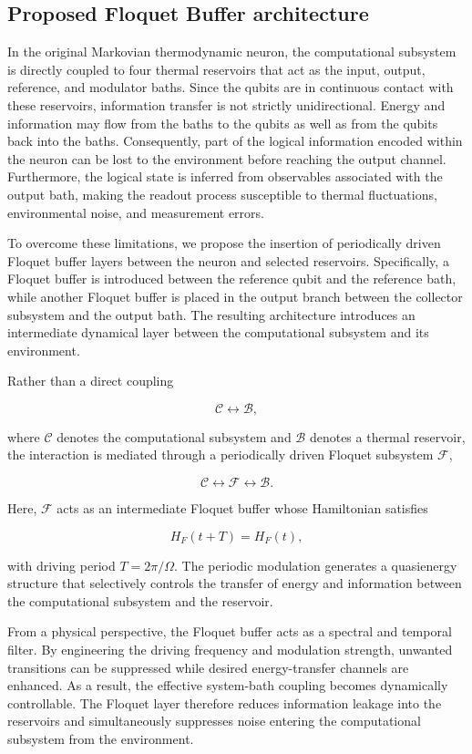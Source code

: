 \documentclass[11pt,a4paper]{article}
\theoremstyle{definition}
\theoremstyle{remark}
\begin{document}
\subsection{Proposed Floquet Buffer architecture}
In the original Markovian thermodynamic neuron, the computational subsystem is directly coupled to four thermal reservoirs that act as the input, output, reference, and modulator baths. Since the qubits are in continuous contact with these reservoirs, information transfer is not strictly unidirectional. Energy and information may flow from the baths to the qubits as well as from the qubits back into the baths. Consequently, part of the logical information encoded within the neuron can be lost to the environment before reaching the output channel. Furthermore, the logical state is inferred from observables associated with the output bath, making the readout process susceptible to thermal fluctuations, environmental noise, and measurement errors.

To overcome these limitations, we propose the insertion of periodically driven Floquet buffer layers between the neuron and selected reservoirs. Specifically, a Floquet buffer is introduced between the reference qubit and the reference bath, while another Floquet buffer is placed in the output branch between the collector subsystem and the output bath. The resulting architecture introduces an intermediate dynamical layer between the computational subsystem and its environment.

Rather than a direct coupling

\[
\mathcal{C}
\longleftrightarrow
\mathcal{B},
\]

where \(\mathcal{C}\) denotes the computational subsystem and \(\mathcal{B}\) denotes a thermal reservoir, the interaction is mediated through a periodically driven Floquet subsystem \(\mathcal{F}\),

\[
\mathcal{C}
\longleftrightarrow
\mathcal{F}
\longleftrightarrow
\mathcal{B}.
\]

Here, \(\mathcal{F}\) acts as an intermediate Floquet buffer whose Hamiltonian satisfies

\[
H_F(t+T)=H_F(t),
\]

with driving period \(T=2\pi/\Omega\). The periodic modulation generates a quasienergy structure that selectively controls the transfer of energy and information between the computational subsystem and the reservoir.

From a physical perspective, the Floquet buffer acts as a spectral and temporal filter. By engineering the driving frequency and modulation strength, unwanted transitions can be suppressed while desired energy-transfer channels are enhanced. As a result, the effective system-bath coupling becomes dynamically controllable. The Floquet layer therefore reduces information leakage into the reservoirs and simultaneously suppresses noise entering the computational subsystem from the environment.
\end{document}
